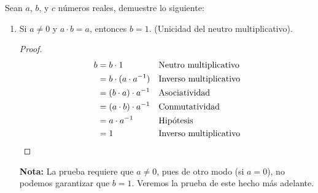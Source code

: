 \documentclass[11pt]{article}
\begin{document}
Sean $a$, $b$, y $c$ números reales, demuestre lo siguiente:
    \begin{enumerate}[label=\alph*)]
    \item Si $a\neq 0$ y $a\cdot b = a$, entonces $b=1$. (Unicidad del neutro multiplicativo).
    \vspace{-1em}
    \begin{proof} 
    \begin{align*}
        b &= b \cdot 1 && \text{Neutro multiplicativo}\\
        &= b \cdot (a\cdot a^{-1}) && \text{Inverso multiplicativo}\\
        &= (b\cdot a) \cdot a^{-1} && \text{Asociatividad}\\
        &= (a\cdot b) \cdot a^{-1} && \text{Conmutatividad}\\
        &= a \cdot a^{-1} && \text{Hipótesis}\\
        &= 1 && \text{Inverso multiplicativo} \qedhere
    \end{align*}    
    \end{proof} \vspace{-1em}
    \textbf{Nota:} La prueba requiere que $a\neq 0$, pues de otro modo (si $a=0$), no podemos garantizar que $b=1$. Veremos la prueba de este hecho más adelante.
    

\end{enumerate}
\end{document}
